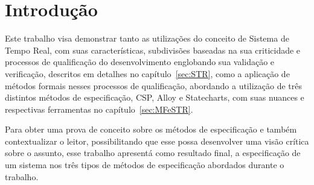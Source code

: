 \section{Introdução}
Este trabalho visa demonstrar tanto as utilizações do conceito de Sistema de Tempo Real,
com suas características, subdivisões baseadas na sua criticidade e processos de qualificação
do desenvolvimento englobando sua validação e verificação, descritos em detalhes no capítulo~\ref{sec:STR},
como a aplicação de métodos formais nesses processos de qualificação, abordando a utilização de três
distintos métodos de especificação, CSP, Alloy e Statecharts, com suas nuances e respectivas ferramentas
no capítulo~\ref{sec:MFeSTR}.

Para obter uma prova de conceito sobre os métodos de especificação e também contextualizar o leitor,
possibilitando que esse possa desenvolver uma visão crítica sobre o assunto, esse trabalho apresentá
como resultado final, a especificação de um sistema nos três tipos de métodos de especificação
abordados durante o trabalho.
